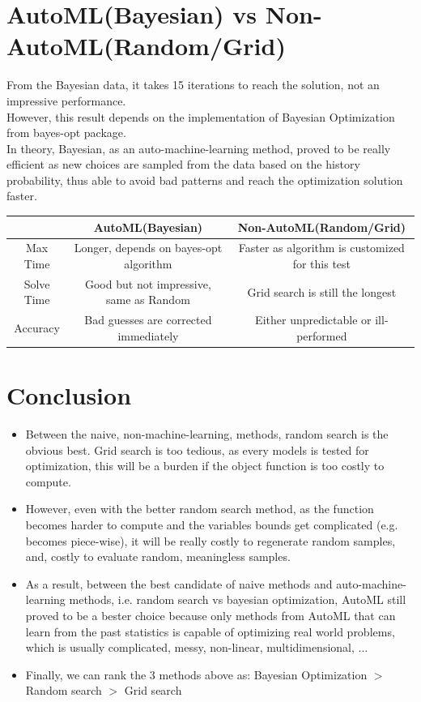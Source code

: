 \documentclass[12pt]{article}
\begin{document}
    \section*{AutoML(Bayesian) vs Non-AutoML(Random/Grid)}
    From the Bayesian data, it takes 15 iterations to reach the solution, not an impressive performance.\\
    However, this result depends on the implementation of Bayesian Optimization from bayes-opt package.\\
    In theory, Bayesian, as an auto-machine-learning method, proved to be really efficient as new choices are sampled from the data based on the history probability, thus able to avoid bad patterns and reach the optimization solution faster.
      \begin{center}
        \begin{tabular}{||c||c|c||} 
        \hline \hline
        & AutoML(Bayesian) & Non-AutoML(Random/Grid) \\
        \hline
        Max Time & Longer, depends on bayes-opt algorithm & Faster as algorithm is customized for this test \\ 
        Solve Time & Good but not impressive, same as Random & Grid search is still the longest \\ 
        Accuracy & Bad guesses are corrected immediately & Either unpredictable or ill-performed \\
        \hline \hline
        \end{tabular}
      \end{center}
    \section*{Conclusion}
      \begin{itemize}
        \item Between the naive, non-machine-learning, methods, random search is the obvious best. Grid search is too tedious, as every models is tested for optimization, this will be a burden if the object function is too costly to compute.
        \item However, even with the better random search method, as the function becomes harder to compute and the variables bounds get complicated (e.g. becomes piece-wise), it will be really costly to regenerate random samples, and, costly to evaluate random, meaningless samples. 
        \item As a result, between the best candidate of naive methods and auto-machine-learning methods, i.e. random search vs bayesian optimization, AutoML still proved to be a bester choice because only methods from AutoML that can learn from the past statistics is capable of optimizing real world problems, which is usually complicated, messy, non-linear, multidimensional, ...
        \item Finally, we can rank the 3 methods above as: Bayesian Optimization \(>\) Random search \(>\) Grid search
      \end{itemize}
\end{document}
